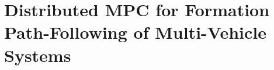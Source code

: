 \chapter{Distributed MPC for Formation Path-Following of Multi-Vehicle Systems}
\label{chap:handpos_MPC}
